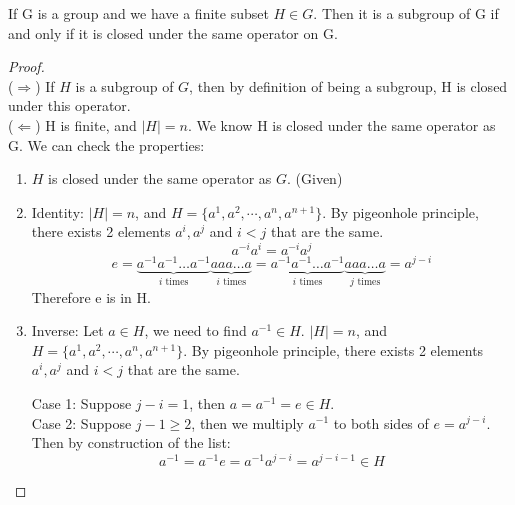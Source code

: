 \begin{theorem}
    If G is a group and we have a finite subset $H \in G$. Then it is a subgroup of G if and only if it is closed under the same operator on G.
\end{theorem}
\begin{proof}
    \vphantom{}\\
    ($\Rightarrow$) If $H$ is a subgroup of $G$, then by definition of being a subgroup, H is closed under this operator.\\
    ($\Leftarrow$) H is finite, and $|H| = n$. We know H is closed under the same operator as G. We can check the properties:
    \begin{enumerate}
        \item $H$ is closed under the same operator as $G$. (Given)
        \item Identity: $|H| = n$, and $H = \{a^1, a^2, \cdots, a^n, a^{n+1}\}$. By pigeonhole principle, there exists 2 elements $a^i, a^j$ and $i < j$ that are the same.
        \[a^{-i}a^i = a^{-i}a^j\]
        \[
        e = \underbrace{a^{-1} a^{-1} \dots a^{-1}}_{i \text{ times}} \underbrace{a a a \dots a}_{i \text{ times}}
         = \underbrace{a^{-1} a^{-1} \dots a^{-1}}_{i \text{ times}} \underbrace{a a a\dots a}_{j \text{ times}} = a^{j-i}
        \]
        Therefore e is in H. 
        \item Inverse: Let $a \in H$, we need to find $a^{-1} \in H$. $|H| = n$, and $H = \{a^1, a^2, \cdots, a^n, a^{n+1}\}$. 
        By pigeonhole principle, there exists 2 elements $a^i, a^j$ and $i < j$ that are the same.
        
        Case 1: Suppose $j-i=1$, then $a = a^{-1} = e \in H$.\\
        Case 2: Suppose $j-1\geq2$, then we multiply $a^{-1}$ to both sides of $e = a^{j-i}$. Then by construction of the list:
        \[a^{-1} = a^{-1}e = a^{-1}a^{j-i} = a^{j-i-1} \in H\]
    \end{enumerate}
\end{proof}